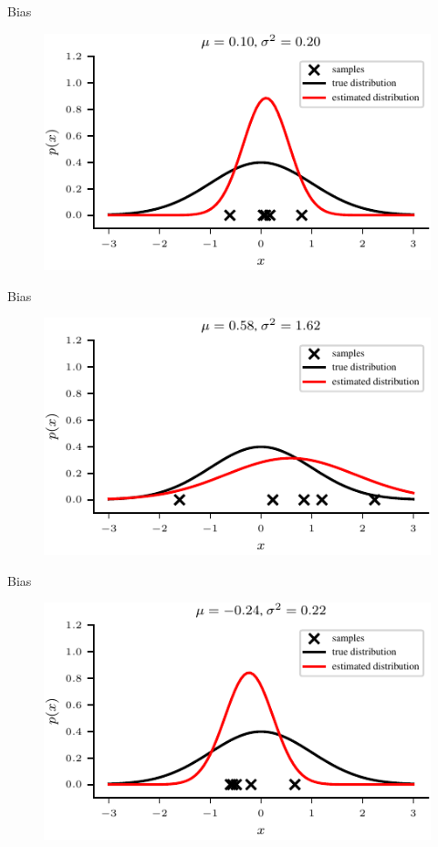 \documentclass[handout]{beamer}
\begin{document}
             \begin{frame}{Bias }
            \begin{figure}
                \includegraphics{../figures/mle/biased-mle-normal-5-3.pdf}
            \end{figure}
            
        \end{frame}

             \begin{frame}{Bias }
            \begin{figure}
                \includegraphics{../figures/mle/biased-mle-normal-5-4.pdf}
            \end{figure}
            
        \end{frame}

             \begin{frame}{Bias }
            \begin{figure}
                \includegraphics{../figures/mle/biased-mle-normal-5-5.pdf}
            \end{figure}
            
        \end{frame}


    

    


    
\end{document}

